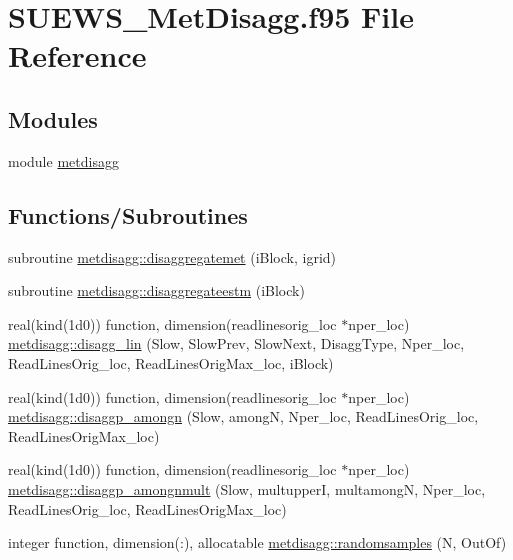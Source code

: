 \hypertarget{_s_u_e_w_s___met_disagg_8f95}{}\section{S\+U\+E\+W\+S\+\_\+\+Met\+Disagg.\+f95 File Reference}
\label{_s_u_e_w_s___met_disagg_8f95}
\subsection*{Modules}
\begin{DoxyCompactItemize}
\item 
module \hyperlink{namespacemetdisagg}{metdisagg}
\end{DoxyCompactItemize}
\subsection*{Functions/\+Subroutines}
\begin{DoxyCompactItemize}
\item 
subroutine \hyperlink{namespacemetdisagg_a9b4db8548b33c73cf14f7280cb8de1b6}{metdisagg\+::disaggregatemet} (i\+Block, igrid)
\item 
subroutine \hyperlink{namespacemetdisagg_a67b638fd95044f06d411c6866ea8b2be}{metdisagg\+::disaggregateestm} (i\+Block)
\item 
real(kind(1d0)) function, dimension(readlinesorig\+\_\+loc $\ast$nper\+\_\+loc) \hyperlink{namespacemetdisagg_a8ad05f5320b2c1380934b4fbd591bbb9}{metdisagg\+::disagg\+\_\+lin} (Slow, Slow\+Prev, Slow\+Next, Disagg\+Type, Nper\+\_\+loc, Read\+Lines\+Orig\+\_\+loc, Read\+Lines\+Orig\+Max\+\_\+loc, i\+Block)
\item 
real(kind(1d0)) function, dimension(readlinesorig\+\_\+loc $\ast$nper\+\_\+loc) \hyperlink{namespacemetdisagg_a68fe3bfaf0b4ea325a7560e9c5ed518a}{metdisagg\+::disaggp\+\_\+amongn} (Slow, amongN, Nper\+\_\+loc, Read\+Lines\+Orig\+\_\+loc, Read\+Lines\+Orig\+Max\+\_\+loc)
\item 
real(kind(1d0)) function, dimension(readlinesorig\+\_\+loc $\ast$nper\+\_\+loc) \hyperlink{namespacemetdisagg_aba0eed0257bc8f0ce67fac76eae7375b}{metdisagg\+::disaggp\+\_\+amongnmult} (Slow, multupperI, multamongN, Nper\+\_\+loc, Read\+Lines\+Orig\+\_\+loc, Read\+Lines\+Orig\+Max\+\_\+loc)
\item 
integer function, dimension(\+:), allocatable \hyperlink{namespacemetdisagg_a23b40d11c1242cb3e4fc0dff94f960db}{metdisagg\+::randomsamples} (N, Out\+Of)
\end{DoxyCompactItemize}
